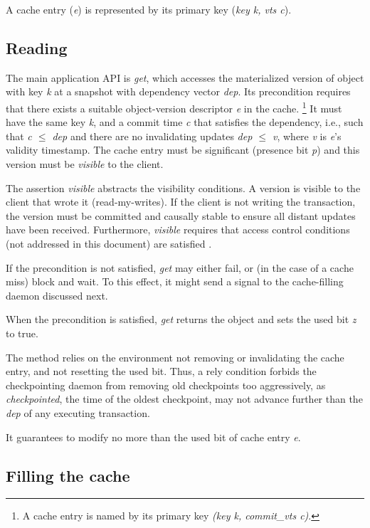 \documentclass[twoside]{article}
\begin{document}
A cache entry (\emph{e}) is represented by its primary key (\emph{key k, vts c}).

\subsection{Reading}
\label{sec:reading}

The main application API is \emph{get}, which accesses the materialized
version of object with key \emph{k} at a snapshot with dependency vector
\emph{dep}.
Its precondition requires that there exists a suitable object-version
descriptor \emph{e} in the cache.%
%
\footnote{
%
  A cache entry is named by its primary key \emph{(key k,
  commit\_vts c)}.
}
%
It must have the same key \emph{k}, and a commit time \emph{c} that
satisfies the dependency, i.e., such that \emph{c $\le$ dep} and there
are no invalidating updates \emph{dep $\le$ v}, where \emph{v} is
\emph{e}'s validity timestamp.
The cache entry must be significant (presence bit \emph{p}) and this
version must be \emph{visible} to the client.

The assertion \emph{visible} abstracts the visibility conditions.
A version is visible to the client that wrote it (read-my-writes).
If the client is not writing the transaction, the version must be
committed and causally stable to ensure all distant updates have been
received.
Furthermore, \emph{visible} requires that access control conditions (not
addressed in this document) are satisfied \cite{sec:rep:1786}.

If the precondition is not satisfied, \emph{get} may either fail, or (in
the case of a cache miss) block and wait.
To this effect, it might send a signal to the cache-filling daemon
discussed next.

When the precondition is satisfied, \emph{get} returns the object and
sets the used bit \emph{z} to true.

The method relies on the environment not removing or invalidating the
cache entry, and not resetting the used bit.
Thus, a rely condition forbids the checkpointing daemon from removing old
checkpoints too aggressively, as \emph{checkpointed}, the time of the
oldest checkpoint, may not advance further than the \emph{dep} of any
executing transaction.

It guarantees to modify no more than the used bit of cache entry
\emph{e}.

\subsection{Filling the cache}
\label{sec:cache-loading}
\end{document}
